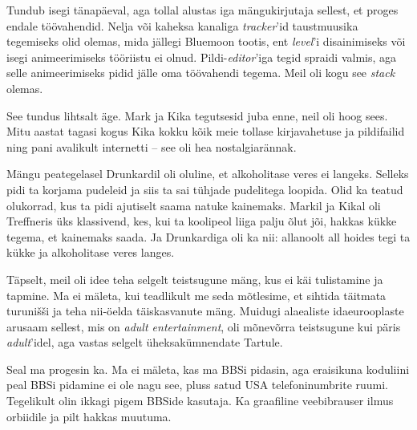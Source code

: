 Tundub isegi tänapäeval, aga tollal alustas iga mängukirjutaja sellest, et 
proges endale töövahendid. Nelja või 
kaheksa kanaliga \emph{tracker}'id taustmuusika tegemiseks olid olemas, mida jällegi 
Bluemoon tootis, ent \emph{level}'i disainimiseks või isegi 
animeerimiseks tööriistu ei olnud. Pildi-\emph{editor}'iga tegid spraidi valmis, aga selle animeerimiseks pidid 
jälle oma töövahendi tegema. Meil oli kogu see \emph{stack} olemas.


See tundus lihtsalt äge. Mark ja 
Kika tegutsesid juba enne, neil oli hoog 
sees. Mitu aastat tagasi kogus Kika kokku kõik meie tollase 
kirjavahetuse ja pildifailid ning pani avalikult internetti -- see oli hea
nostalgiarännak. 

Mängu peategelasel Drunkardil oli oluline, et alkoholitase 
veres ei langeks. Selleks pidi ta korjama pudeleid ja siis ta sai 
tühjade pudelitega loopida. Olid ka teatud olukorrad, kus ta pidi ajutiselt 
saama natuke kainemaks. Markil ja 
Kikal oli Treffneris üks klassivend, kes, kui ta 
koolipeol liiga palju õlut jõi, hakkas kükke tegema, et kainemaks saada. Ja 
Drunkardiga oli ka nii: allanoolt all hoides tegi ta kükke ja alkoholitase veres langes.


Täpselt, meil oli idee teha selgelt teistsugune mäng, kus ei käi 
tulistamine ja tapmine. Ma ei mäleta, kui 
teadlikult me seda mõtlesime, et sihtida täitmata turunišši ja teha nii-öelda 
täiskasvanute mäng. Muidugi alaealiste idaeurooplaste arusaam sellest, mis 
on \emph{adult entertainment}, oli mõnevõrra teistsugune kui päris 
\emph{adult}'idel, aga vastas selgelt üheksakümnendate Tartule.


Seal ma progesin ka. Ma ei mäleta, kas ma BBSi pidasin, aga 
eraisikuna koduliini peal BBSi pidamine ei ole nagu see, 
pluss satud USA telefoninumbrite ruumi. Tegelikult olin ikkagi pigem 
BBSide kasutaja. Ka graafiline veebibrauser ilmus orbiidile ja pilt hakkas 
muutuma. 

